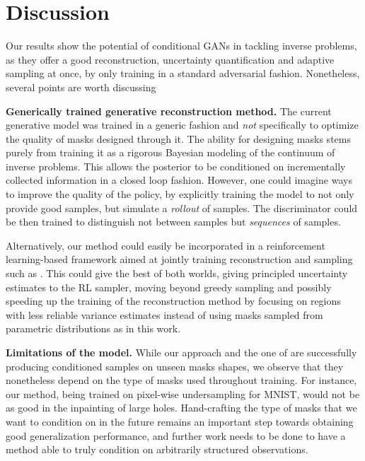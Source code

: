 \section{Discussion}\label{sec:gans_discussion}

Our results show the potential of conditional GANs in tackling inverse problems, as they offer a good reconstruction, uncertainty quantification and adaptive sampling at once, by only training in a standard adversarial fashion. Nonetheless, several points are worth discussing

\textbf{Generically trained generative reconstruction method.} The current generative model was trained in a generic fashion and \emph{not} specifically to optimize the quality of masks designed through it. The ability for designing masks stems purely from training it as a rigorous Bayesian modeling of the continuum of inverse problems. This allows the posterior to be conditioned on incrementally collected information in a closed loop fashion. However, one could imagine ways to improve the quality of the policy, by explicitly training the model to not only provide good samples, but simulate a \textit{rollout} of samples. The discriminator could be then trained to distinguish not between samples but \textit{sequences} of samples. 

Alternatively, our method could easily be incorporated in a reinforcement learning-based framework aimed at jointly training reconstruction and sampling such as \citet{jin2019self}. This could give the best of both worlds, giving principled uncertainty estimates to the RL sampler, moving beyond greedy sampling and possibly speeding up the training of the reconstruction method by focusing on regions with less reliable variance estimates instead of using masks sampled from parametric distributions as in this work.

\textbf{Limitations of the model.} While our approach and the one of \citet{belghazi2019learning} are successfully producing conditioned samples on unseen masks shapes, we observe that they nonetheless depend on the type of masks used throughout training. For instance, our method, being trained on pixel-wise undersampling for MNIST, would not be as good in the inpainting of large holes. Hand-crafting the type of masks that we want to condition on in the future remains an important step towards obtaining good generalization performance, and further work needs to be done to have a method able to truly condition on arbitrarily structured observations.

